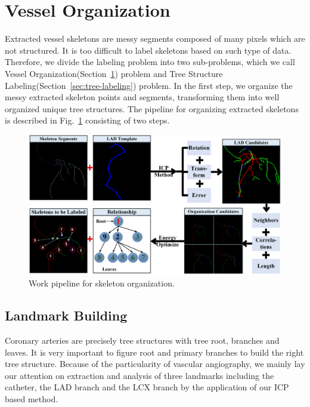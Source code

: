 \documentclass[journal]{IEEEtran}
\begin{document}
\section{Vessel Organization}
\label{sec:vessel-organization}
Extracted vessel skeletons are messy segments composed of many pixels which are not structured. It is too difficult to label skeletons based on such type of data. Therefore, we divide the labeling problem into two sub-problems, which we call Vessel Organization(Section~\ref{sec:vessel-organization}) problem and Tree Structure Labeling(Section~\ref{sec:tree-labeling}) problem. In the first step, we organize the messy extracted skeleton points and segments, transforming them into well organized unique tree structures. The pipeline for organizing extracted skeletons is described in Fig.~\ref{fig:skel_organization} consisting of two steps.

\begin{figure}[!t]
\centering
\includegraphics[width=1.0\linewidth]{./images/skel-orga-pipeline.png}
\caption{Work pipeline for skeleton organization.}
\label{fig:skel_organization}
\end{figure}

\subsection{Landmark Building}
Coronary arteries are precisely tree structures with tree root, branches and leaves. It is very important to figure root and primary branches to build the right tree structure. Because of the particularity of vascular angiography, we mainly lay our attention on extraction and analysis of three landmarks including the catheter, the LAD branch and the LCX branch by the application of our ICP based method. 
\end{document}
